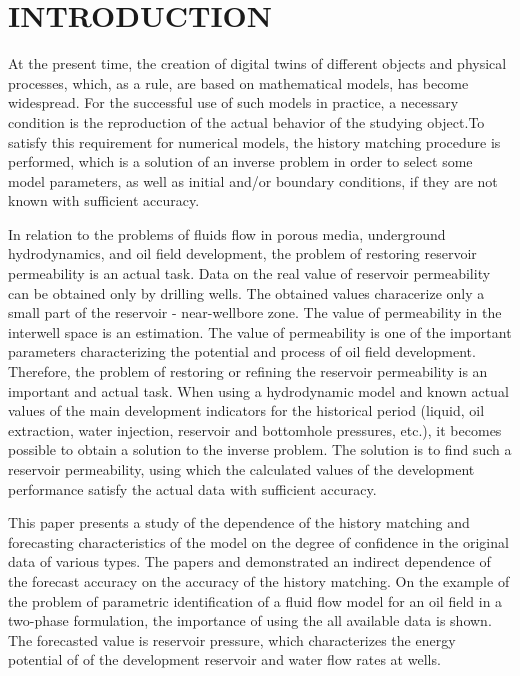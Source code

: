 \documentclass[
11pt,%
tightenlines,%
twoside,%
onecolumn,%
nofloats,%
nobibnotes,%
nofootinbib,%
superscriptaddress,%
noshowpacs,%
centertags]%
{revtex4}
\begin{document}
\maketitle




\section{INTRODUCTION}
At the present time, the creation of digital twins of different objects and physical processes, which, as a rule, are based on mathematical models, has become widespread. For the successful use
of such models in practice, a necessary condition is the
reproduction of the actual behavior of the studying object.To satisfy
this requirement for numerical models, the history matching
procedure is performed, which is a solution of an inverse problem in
order to select some model parameters, as well as initial and/or
boundary conditions, if they are not known with sufficient accuracy.

In relation to the problems of fluids flow in porous media, underground
hydrodynamics, and oil field development, the problem of
restoring reservoir permeability is an actual task. Data on the real value of reservoir permeability can be obtained only by drilling wells. The obtained values characerize only a small part of the reservoir - near-wellbore zone. The value of permeability in the interwell space is an estimation. The value
of permeability is one of the important parameters characterizing
the potential and process of oil field development. Therefore, the
problem of restoring or refining the reservoir permeability is an important and actual task. When using a hydrodynamic model and known actual values of the
main development indicators for the historical period (liquid, oil
extraction, water injection, reservoir and bottomhole pressures,
etc.), it becomes possible to obtain a solution to the inverse
problem. The solution is to find such a reservoir permeability, using which the calculated values of the development performance satisfy the actual data with sufficient accuracy.

This paper presents a study of the dependence of the history
matching and forecasting characteristics of the model on the degree
of confidence in the original data of various types. The papers
\cite{mus} and \cite{kos} demonstrated an indirect dependence of the
forecast accuracy on the accuracy of the history matching. On the example of the problem of parametric identification
of a fluid flow model for an oil field in a two-phase formulation,
the importance of using the all available data is shown.
The forecasted value is reservoir pressure, which characterizes
the energy potential of of the development reservoir and water flow 
rates at wells.
\end{document}
